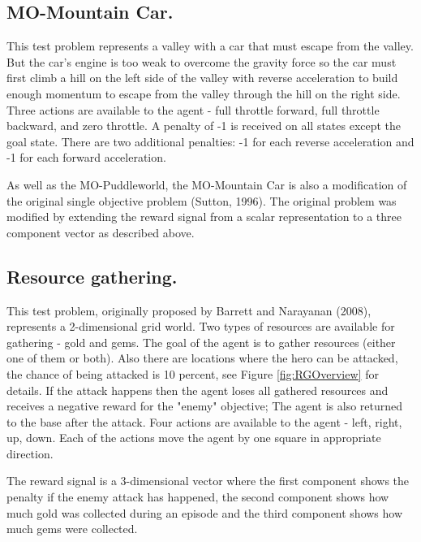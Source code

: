 \subsection{MO-Mountain Car.}
This test problem represents a valley with a car that must escape from the valley. But the car's engine is too weak to overcome the gravity force so the car must first climb a hill on the left side of the valley with reverse acceleration to build enough momentum to escape from the valley through the hill on the right side. Three actions are available to the agent - full throttle forward, full throttle backward, and zero throttle. A penalty of -1 is received on all states except the goal state. There are two additional penalties: -1 for each reverse acceleration and -1 for each forward acceleration.

As well as the MO-Puddleworld, the MO-Mountain Car is also a modification of the original single objective problem (Sutton, 1996\nocite{sutton1996generalization}). The original problem was modified by extending the reward signal from a scalar representation to a three component vector as described above.

\subsection{Resource gathering.}
\label{sec:resource-gathering}
This test problem, originally proposed by Barrett and Narayanan (2008)\nocite{barrett2008learning}, represents a 2-dimensional grid world. Two types of resources are available for gathering - gold and gems. The goal of the agent is to gather resources (either one of them or both). Also there are locations where the hero can be attacked, the chance of being attacked is 10 percent, see Figure \ref{fig:RGOverview} for details. If the attack happens then the agent loses all gathered resources and receives a negative reward for the "enemy" objective; The agent is also returned to the base after the attack. Four actions are available to the agent - left, right, up, down. Each of the actions move the agent by one square in appropriate direction.

The reward signal is a 3-dimensional vector where the first component shows the penalty if the enemy attack has happened, the second component shows how much gold was collected during an episode and the third component shows how much gems were collected.

